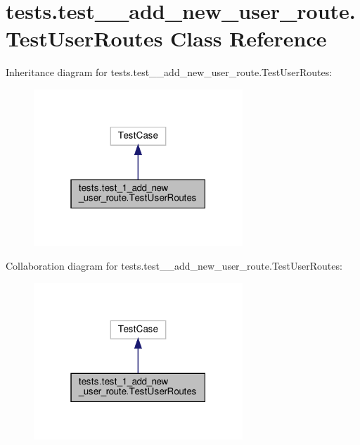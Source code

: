 \hypertarget{classtests_1_1test__1__add__new__user__route_1_1_test_user_routes}{}\section{tests.\+test\+\_\+\_\+add\+\_\+new\+\_\+user\+\_\+route.\+Test\+User\+Routes Class Reference}
\label{classtests_1_1test__1__add__new__user__route_1_1_test_user_routes}


Inheritance diagram for tests.\+test\+\_\+\_\+add\+\_\+new\+\_\+user\+\_\+route.\+Test\+User\+Routes\+:
\nopagebreak
\begin{figure}[H]
\begin{center}
\leavevmode
\includegraphics[width=223pt]{classtests_1_1test__1__add__new__user__route_1_1_test_user_routes__inherit__graph}
\end{center}
\end{figure}


Collaboration diagram for tests.\+test\+\_\+\_\+add\+\_\+new\+\_\+user\+\_\+route.\+Test\+User\+Routes\+:
\nopagebreak
\begin{figure}[H]
\begin{center}
\leavevmode
\includegraphics[width=223pt]{classtests_1_1test__1__add__new__user__route_1_1_test_user_routes__coll__graph}
\end{center}
\end{figure}
